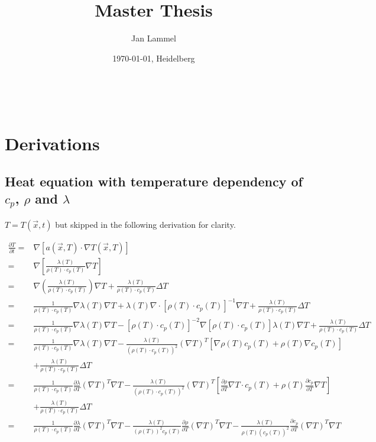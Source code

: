 \documentclass{scrartcl}[12pt, halfparskip]
\title{Master Thesis}
\author{Jan Lammel}
\date{\today{}, Heidelberg}
\begin{document}
\maketitle \ \\ 
\newpage

\section{Derivations}
\subsection{Heat equation with temperature dependency of $c_p$, $\rho$ and $\lambda$}

$T = T(\vec{x},t)$ but skipped in the following derivation for clarity.

\begin{align*}
	\frac{\partial T}{\partial t} = & \nabla \left[ a(\vec{x},T) \cdot \nabla T(\vec{x},T) \right] \\
	= & \nabla \left[ \frac{\lambda(T)}{\rho(T) \cdot c_p(T)} \nabla T \right] \\
	= & \nabla \left( \frac{\lambda(T)}{\rho(T) \cdot c_p(T)} \right) \nabla T + \frac{\lambda(T)}{\rho(T) \cdot c_p(T)} \Delta T \\
	= & \frac{1}{\rho (T) \cdot c_p (T)} \nabla \lambda (T) \nabla T + \lambda (T) \nabla \cdot \left[ \rho (T) \cdot c_p (T) \right]^{-1} \nabla T + \frac{\lambda (T)}{\rho (T) \cdot c_p (T)} \Delta T \\
	= & \frac{1}{\rho (T) \cdot c_p (T)} \nabla \lambda (T) \nabla T - \left[ \rho (T) \cdot c_p (T) \right]^{-2} \nabla \left[ \rho (T) \cdot c_p (T) \right] \lambda(T) \nabla T + \frac{\lambda (T)}{\rho (T) \cdot c_p (T)} \Delta T \\
	= & \frac{1}{\rho (T) \cdot c_p (T)} \nabla \lambda (T) \nabla T - \frac{\lambda (T)}{(\rho(T) \cdot c_p(T))^2} (\nabla T)^T \left[ \nabla \rho(T) c_p(T) + \rho(T) \nabla c_p(T) \right] \\
	& + \frac{\lambda (T)}{\rho (T) \cdot c_p (T)} \Delta T \\
	= & \frac{1}{\rho (T) \cdot c_p (T)} \frac{\partial \lambda}{\partial T} (\nabla T)^T \nabla T - \frac{\lambda (T)}{(\rho(T) \cdot c_p(T))^2} (\nabla T)^T \left[ \frac{\partial \rho}{\partial T} \nabla T \cdot c_p(T) + \rho(T) \frac{ \partial c_p}{\partial T} \nabla T \right] \\
	& + \frac{\lambda (T)}{\rho (T) \cdot c_p (T)} \Delta T \\
	= & \frac{1}{\rho (T) \cdot c_p (T)} \frac{\partial \lambda}{\partial T} (\nabla T)^T \nabla T - \frac{\lambda (T)}{(\rho(T))^2 c_p(T)} \frac{\partial \rho}{\partial T} (\nabla T)^T \nabla T - \frac{\lambda (T)}{\rho(T) (c_p(T))^2} \frac{\partial c_p}{\partial T} (\nabla T)^T \nabla T \\

\end{align*}
\end{document}
